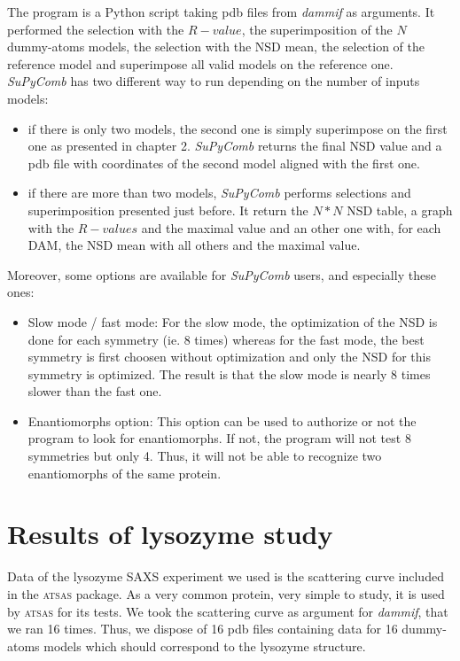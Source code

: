 \documentclass[a4paper, 11pt]{report}
\begin{document}
The program is a Python script taking pdb files from \textit{dammif} 
as arguments. 
It performed the selection with the $R-value$, the superimposition of 
the $N$ dummy-atoms models, the selection with the NSD mean, the 
selection of the reference model and superimpose all valid models on 
the reference one.\\
\textit{SuPyComb} has two different way to run depending on the number 
of inputs models:
\begin{itemize}
  \item if there is only two models, the second one is simply 
        superimpose on the first one as presented in chapter 2.
        \textit{SuPyComb} returns the final NSD value and a pdb file 
        with coordinates of the second model aligned with the first one.
  \item if there are more than two models, \textit{SuPyComb} performs 
        selections and superimposition presented just before. 
        It return the $N*N$ NSD table, a graph with the $R-values$ and 
        the maximal value and an other one with, for each DAM, the NSD 
        mean with all others and the maximal value. 
\end{itemize}
Moreover, some options are available for \textit{SuPyComb} users, and 
especially these ones:
\begin{itemize}
  \item Slow mode / fast mode:
  For the slow mode, the optimization of the NSD is done for each symmetry 
  (ie. 8 times) whereas for the fast mode, the best symmetry is first 
  choosen without optimization and only the NSD for this symmetry is 
  optimized.
  The result is that the slow mode is nearly 8 times slower than the fast 
  one.
  \item Enantiomorphs option:
  This option can be used to authorize or not the program to look for 
  enantiomorphs. 
  If not, the program will not test 8 symmetries but only 4. 
  Thus, it will not be able to recognize two enantiomorphs of the 
  same protein.
\end{itemize}

\section{Results of lysozyme study}%

Data of the lysozyme SAXS experiment we used is the scattering curve 
included in the \textsc{atsas} package. 
As a very common protein, very simple to study, it is used by 
\textsc{atsas} for its tests. 
We took the scattering curve as argument for \textit{dammif}, that we 
ran 16 times. 
Thus, we dispose of 16 pdb files containing data for 16 dummy-atoms 
models which should correspond to the lysozyme structure.\\
\end{document}
